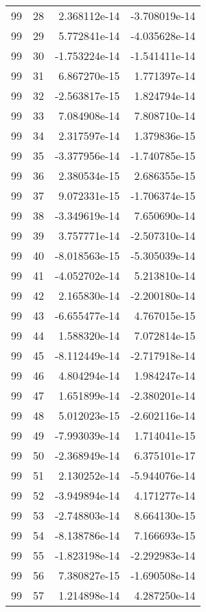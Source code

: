 \begin{tabular}{rrrr}
  99 &   28 &  2.368112e-14 & -3.708019e-14 \\
  99 &   29 &  5.772841e-14 & -4.035628e-14 \\
  99 &   30 & -1.753224e-14 & -1.541411e-14 \\
  99 &   31 &  6.867270e-15 &  1.771397e-14 \\
  99 &   32 & -2.563817e-15 &  1.824794e-14 \\
  99 &   33 &  7.084908e-14 &  7.808710e-14 \\
  99 &   34 &  2.317597e-14 &  1.379836e-15 \\
  99 &   35 & -3.377956e-14 & -1.740785e-15 \\
  99 &   36 &  2.380534e-15 &  2.686355e-15 \\
  99 &   37 &  9.072331e-15 & -1.706374e-15 \\
  99 &   38 & -3.349619e-14 &  7.650690e-14 \\
  99 &   39 &  3.757771e-14 & -2.507310e-14 \\
  99 &   40 & -8.018563e-15 & -5.305039e-14 \\
  99 &   41 & -4.052702e-14 &  5.213810e-14 \\
  99 &   42 &  2.165830e-14 & -2.200180e-14 \\
  99 &   43 & -6.655477e-14 &  4.767015e-15 \\
  99 &   44 &  1.588320e-14 &  7.072814e-15 \\
  99 &   45 & -8.112449e-14 & -2.717918e-14 \\
  99 &   46 &  4.804294e-14 &  1.984247e-14 \\
  99 &   47 &  1.651899e-14 & -2.380201e-14 \\
  99 &   48 &  5.012023e-15 & -2.602116e-14 \\
  99 &   49 & -7.993039e-14 &  1.714041e-15 \\
  99 &   50 & -2.368949e-14 &  6.375101e-17 \\
  99 &   51 &  2.130252e-14 & -5.944076e-14 \\
  99 &   52 & -3.949894e-14 &  4.171277e-14 \\
  99 &   53 & -2.748803e-14 &  8.664130e-15 \\
  99 &   54 & -8.138786e-14 &  7.166693e-15 \\
  99 &   55 & -1.823198e-14 & -2.292983e-14 \\
  99 &   56 &  7.380827e-15 & -1.690508e-14 \\
  99 &   57 &  1.214898e-14 &  4.287250e-14 \\

\end{tabular}
